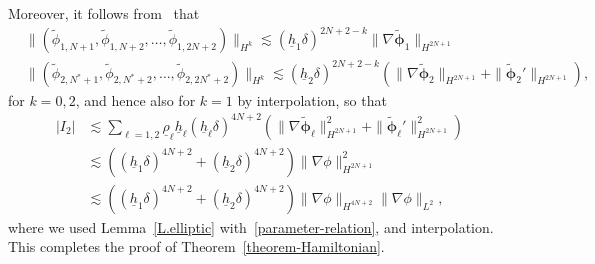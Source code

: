 \documentclass[11pt,leqno]{article}
\numberwithin{equation}{section}
\numberwithin{figure}{section}
\begin{document}
%
Moreover, it follows from~\cite[Lemmas 5.2 and 5.4]{Iguchi2018-2} that 
%
\begin{align*}
& \|(\tilde{\phi}_{1,N+1},\tilde{\phi}_{1,N+2},\ldots,\tilde{\phi}_{1,2N+2})\|_{H^k}
 \lesssim (\underline{h}_1\delta)^{2N+2-k}\|\nabla\tilde{\bm{\phi}}_1\|_{H^{2N+1}} \\
& \|(\tilde{\phi}_{2,N^*+1},\tilde{\phi}_{2,N^*+2},\ldots,\tilde{\phi}_{2,2N^*+2})\|_{H^k}
 \lesssim (\underline{h}_2\delta)^{2N+2-k}(
  \|\nabla\tilde{\bm{\phi}}_2\|_{H^{2N+1}} + \|\tilde{\bm{\phi}}_2'\|_{H^{2N+1}} ),
\end{align*}
%
for $k=0,2$, and hence also for $k=1$ by interpolation, so that 
%
\begin{align*}
|I_2|
&\lesssim \sum_{\ell=1,2}\underline{\rho}_\ell\underline{h}_\ell(\underline{h}_\ell\delta)^{4N+2}
 ( \|\nabla\tilde{\bm{\phi}}_\ell\|_{H^{2N+1}}^2 + \|\tilde{\bm{\phi}}_\ell'\|_{H^{2N+1}}^2 ) \\
&\lesssim ((\underline{h}_1\delta)^{4N+2}+(\underline{h}_2\delta)^{4N+2})\|\nabla\phi\|_{H^{2N+1}}^2 \\
&\lesssim ((\underline{h}_1\delta)^{4N+2}+(\underline{h}_2\delta)^{4N+2})\|\nabla\phi\|_{H^{4N+2}}\|\nabla\phi\|_{L^2}, 
\end{align*}
%
where we used Lemma~\ref{L.elliptic} with~\eqref{parameter-relation}, and interpolation. 
This completes the proof of Theorem~\ref{theorem-Hamiltonian}.
\end{document}
